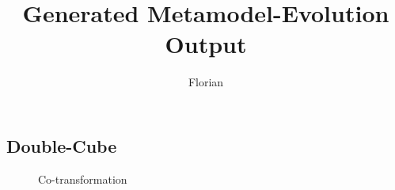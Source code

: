 \documentclass[a4paper,10pt]{article}
\title{Generated Metamodel-Evolution Output}
\author{Florian}
\begin{document}
\maketitle

\begin{landscape}

\section{Double-Cube}

\begin{figure} [htb]
    \begin{center}
    
    \end{center}
      \vspace*{-1cm}
    \caption{Co-transformation}
    \label{fig:co-transformation}
\end{figure}


\end{landscape}
\end{document}
